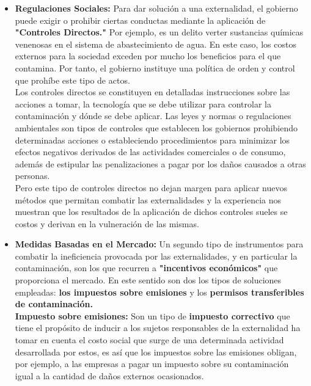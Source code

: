 \begin{itemize}
	\item \textbf{Regulaciones Sociales:} Para dar solución a una externalidad, el gobierno puede exigir o prohibir ciertas conductas mediante la aplicación de \textbf{\textcolor[rgb]{0,0.24,0.5}{"Controles Directos."}} Por ejemplo, es un delito verter sustancias químicas venenosas en el sistema de abastecimiento de agua. En este caso, los costos externos para la sociedad exceden	por mucho los beneficios para el que contamina. Por tanto, el gobierno instituye una	política de orden y control que prohíbe este tipo de actos.\\
	
	Los controles directos se constituyen en detalladas instrucciones sobre las acciones a tomar, la tecnología que se debe utilizar para controlar la contaminación y dónde se debe aplicar. Las leyes y normas o regulaciones ambientales son tipos de controles que establecen los gobiernos prohibiendo determinadas acciones o estableciendo procedimientos para minimizar los efectos negativos derivados de las actividades comerciales o de consumo, además de estipular las penalizaciones a pagar por los daños causados a otras personas.\\
	
	Pero este tipo de controles directos no dejan margen para aplicar nuevos métodos que permitan combatir las externalidades y la experiencia nos muestran que los resultados de la aplicación de dichos controles sueles se costos y derivan en la vulneración de las mismas.
	
	\item \textbf{Medidas Basadas en el Mercado:} Un segundo tipo de instrumentos para combatir la ineficiencia	provocada por las externalidades, y en particular la contaminación, son los que recurren a \textbf{\textcolor[rgb]{0,0.24,0.5}{"incentivos económicos"}} que proporciona el mercado. En este sentido son dos los tipos de soluciones empleadas: \textbf{los impuestos sobre emisiones} y los \textbf{permisos transferibles de contaminación.}\\
	
	\textbf{\textcolor[rgb]{0,0.24,0.5}{Impuesto sobre emisiones:}} Son un tipo de \textbf{impuesto correctivo} que tiene el propósito de inducir a los sujetos responsables de la externalidad ha tomar en cuenta el costo social que surge de una determinada actividad desarrollada por estos, es así que los impuestos sobre las emisiones obligan, por ejemplo, a las empresas a pagar un impuesto sobre su contaminación igual a la cantidad de daños externos ocasionados.\\
	

\end{itemize}
